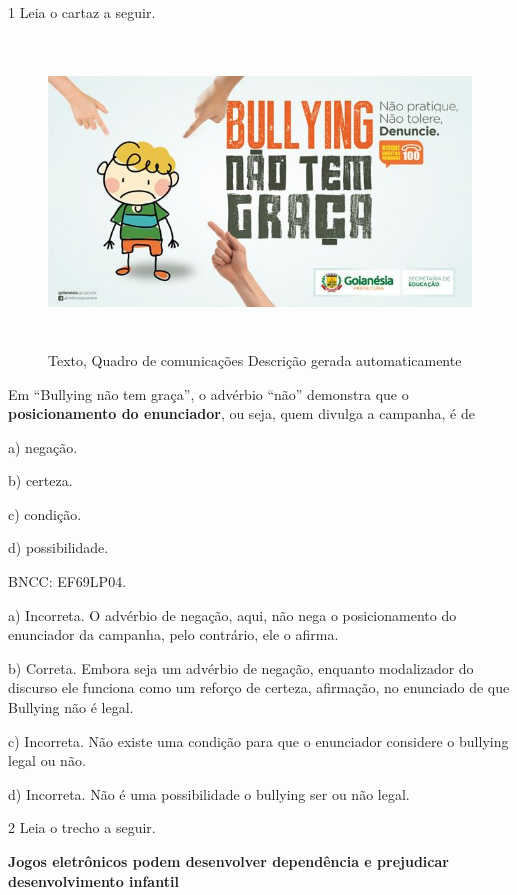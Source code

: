 {



\num{1} Leia o cartaz a seguir.

\begin{figure}
\centering
\includegraphics[width=5.90556in,height=3.22639in]{./imgSAEB_6_POR/media/image26.jpeg}
\caption{Texto, Quadro de comunicações Descrição gerada automaticamente}
\end{figure}

Em ``Bullying não tem graça'', o advérbio ``não'' demonstra que o
\textbf{posicionamento do enunciador}, ou seja, quem divulga a campanha,
é de

a) negação.

b) certeza.

c) condição.

d) possibilidade.

BNCC: EF69LP04.

a) Incorreta. O advérbio de negação, aqui, não nega o posicionamento do
enunciador da campanha, pelo contrário, ele o afirma.

b) Correta. Embora seja um advérbio de negação, enquanto modalizador do
discurso ele funciona como um reforço de certeza, afirmação, no
enunciado de que Bullying não é legal.

c) Incorreta. Não existe uma condição para que o enunciador considere o
bullying legal ou não.

d) Incorreta. Não é uma possibilidade o bullying ser ou não legal.

\num{2} Leia o trecho a seguir.

\textbf{Jogos eletrônicos podem desenvolver dependência e prejudicar
desenvolvimento infantil}

}
